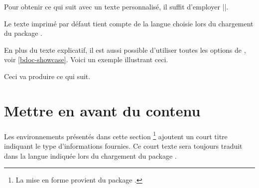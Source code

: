 \documentclass[10pt, a4paper]{article}
\begin{document}


\begin{bdocexa}
    Pour obtenir ce qui suit avec un texte personnalisé, il suffit d'employer \bdocinlatex||.

    \medskip

    \begin{bdoc-doc-showcase}
    \end{bdoc-doc-showcase}
\end{bdocexa}




\begin{bdocnote}
    Le texte imprimé par défaut tient compte de la langue choisie lors du chargement du package .
\end{bdocnote}




\begin{bdocexa}
    En plus du texte explicatif, il est aussi possible d'utiliser toutes les options de , voir \ref{bdoc-showcase}.
    Voici un exemple illustrant ceci.

    \medskip


    \medskip

    Ceci va produire ce qui suit.

    \medskip

    \begin{bdoc-doc-showcase}
        
    \end{bdoc-doc-showcase}
\end{bdocexa}


\section{Mettre en avant du contenu}

\begin{bdocnote}
    Les environnements présentés dans cette section
    \footnote{
        La mise en forme provient du package .
    }
    ajoutent un court titre indiquant le type d'informations fournies.
    Ce court texte sera toujours traduit dans la langue indiquée lors du chargement du package .
\end{bdocnote}
\end{document}
